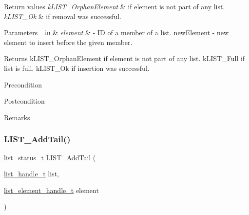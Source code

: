 \begin{DoxyRetVals}{Return values}
{\em k\+L\+I\+S\+T\+\_\+\+Orphan\+Element} & if element is not part of any list. \\
\hline
{\em k\+L\+I\+S\+T\+\_\+\+Ok} & if removal was successful.\\
\hline
\end{DoxyRetVals}


 
\begin{DoxyParams}[1]{Parameters}
\mbox{\texttt{ in}}  & {\em element} & -\/ ID of a member of a list. new\+Element -\/ new element to insert before the given member.\\
\hline
\end{DoxyParams}
\begin{DoxyReturn}{Returns}
k\+L\+I\+S\+T\+\_\+\+Orphan\+Element if element is not part of any list. k\+L\+I\+S\+T\+\_\+\+Full if list is full. k\+L\+I\+S\+T\+\_\+\+Ok if insertion was successful.
\end{DoxyReturn}
\begin{DoxyPrecond}{Precondition}

\end{DoxyPrecond}
\begin{DoxyPostcond}{Postcondition}

\end{DoxyPostcond}
\begin{DoxyRemark}{Remarks}
\begin{DoxyVerb}\end{DoxyVerb}
 
\end{DoxyRemark}
\mbox{\label{group___generic_list_ga06283836b30da75730f755ea4be30b93}} 
\subsubsection{\texorpdfstring{LIST\_AddTail()}{LIST\_AddTail()}}
{\footnotesize\ttfamily \mbox{\hyperlink{group___generic_list_gaae3dc4a15b24287b8c3ac8706195aa7e}{list\+\_\+status\+\_\+t}} L\+I\+S\+T\+\_\+\+Add\+Tail (\begin{DoxyParamCaption}\item[{\mbox{\hyperlink{structlist__label}{list\+\_\+handle\+\_\+t}}}]{list,  }\item[{\mbox{\hyperlink{structlist__element__tag}{list\+\_\+element\+\_\+handle\+\_\+t}}}]{element }\end{DoxyParamCaption})}




